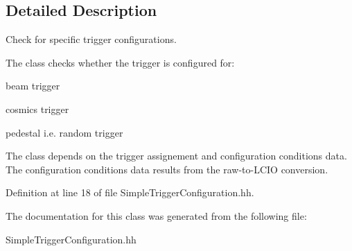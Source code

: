 \subsection{Detailed Description}
Check for specific trigger configurations. 

The class checks whether the trigger is configured for\-: 
\begin{DoxyItemize}
\item beam trigger 
\item cosmics trigger 
\item pedestal i.\-e. random trigger 
\end{DoxyItemize}The class depends on the trigger assignement and configuration conditions data. The configuration conditions data results from the raw-\/to-\/\-L\-C\-I\-O conversion. 

Definition at line 18 of file Simple\-Trigger\-Configuration.\-hh.



The documentation for this class was generated from the following file\-:\begin{DoxyCompactItemize}
\item 
Simple\-Trigger\-Configuration.\-hh\end{DoxyCompactItemize}
